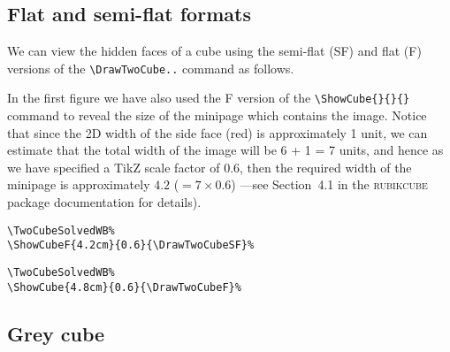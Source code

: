 \documentclass[a4paper]{article}
\begin{document}
\pagebreak 

\subsection{Flat and semi-flat formats}

We can view the hidden faces of a cube using the semi-flat (SF) and 
flat (F) versions of the \verb!\DrawTwoCube..! command as follows.

In the first figure we have also used the F version of the  
\verb!\ShowCube{}{}{}! command to reveal the size of the minipage 
which contains the image. Notice that since the 2D width of the side 
face (red) is approximately 1 unit, we can estimate that the total 
width of the image  will be 6 + 1 = 7 units, and hence as we have 
specified a TikZ scale factor of 0.6, then the  required width of 
the minipage is approximately $4.2$ ($= 7 \times 0.6$) 
---see Section~4.1 in the \textsc{rubikcube} package documentation 
for details).

\bigskip 
 
\begin{minipage}{0.3\textwidth}
\centering
\TwoCubeSolvedWB%
%
\end{minipage}
    \hspace{2cm}
\begin{minipage}{0.3\textwidth}
\begin{verbatim}
\TwoCubeSolvedWB% 
\ShowCubeF{4.2cm}{0.6}{\DrawTwoCubeSF}%
\end{verbatim}
 \end{minipage}

\bigskip 
 
\begin{minipage}{0.3\textwidth}
\centering
\TwoCubeSolvedWB%
%
\end{minipage}
    \hspace{2cm}
\begin{minipage}{0.3\textwidth}
\begin{verbatim}
\TwoCubeSolvedWB% 
\ShowCube{4.8cm}{0.6}{\DrawTwoCubeF}%
\end{verbatim}
 \end{minipage}

 
 
 \pagebreak
 
\subsection{Grey cube}
\end{document}
